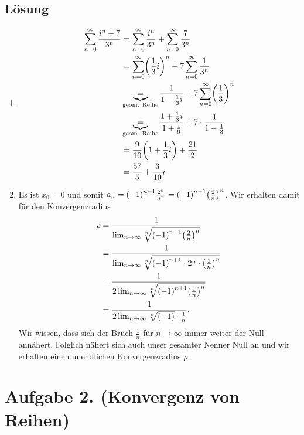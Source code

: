 \documentclass[german,12pt]{homework}
\DeclarePairedDelimiter{\enbrace}{(}{)}
\begin{document}
    \subsection*{Lösung}
    \begin{enumerate}
        \item
        \begin{align*}
            \sum_{n = 0}^\infty\frac{i^n + 7}{3^n} &= \sum_{n = 0}^\infty
            \frac{i^n}{3^n} + \sum_{n = 0}^\infty\frac{7}{3^n}\\
            &= \sum_{n = 0}^\infty\enbrace*{\frac{1}{3}i}^n + 7\sum_{n =
            0}^\infty\frac{1}{3^n}\\
            &\underbrace{=}_\text{geom. Reihe} \frac{1}{1 - \frac{1}{3}i} +
            7\sum_{n = 0}^\infty\enbrace*{\frac{1}{3}}^n\\
            &\underbrace{=}_\text{geom. Reihe} \frac{1 + \frac{1}{3}i}{1 +
            \frac{1}{9}} + 7 \cdot \frac{1}{1 - \frac{1}{3}}\\
            &= \frac{9}{10}\enbrace*{1 + \frac{1}{3}i} + \frac{21}{2}\\
            &= \frac{57}{5} + \frac{3}{10}i
        \end{align*}
        \item Es ist \(x_0 = 0\) und somit \(a_n = \enbrace*{-1}^{n - 1}\frac{2^n}{n^n} = \enbrace*{-1}^{n - 1}\enbrace*{\frac{2}{n}}^n\). Wir
        erhalten damit für den Konvergenzradius
        \begin{align*}
            \rho &= \frac{1}{\lim_{n \to \infty}\sqrt[n]{\enbrace*{-1}^{n - 1}
            \enbrace*{\frac{2}{n}}^n}}\\
            &= \frac{1}{\lim_{n \to \infty}\sqrt[n]{\enbrace*{-1}^{n + 1} \cdot
            2^n \cdot \enbrace*{\frac{1}{n}}^n}}\\
            &= \frac{1}{2\lim_{n \to \infty}\sqrt[n]{\enbrace*{-1}^{n + 1}
            \enbrace*{\frac{1}{n}}^n}}\\
            &= \frac{1}{2\lim_{n \to \infty}\sqrt[n]{\enbrace*{-1}} \cdot \frac{1}{n}}.
        \end{align*}
        Wir wissen, dass sich der Bruch \(\frac{1}{n}\) für \(n \to \infty\)
        immer weiter der Null annähert. Folglich nähert sich auch unser gesamter
        Nenner Null an und wir erhalten einen unendlichen Konvergenzradius
        \(\rho\).
    \end{enumerate}

    \section*{Aufgabe 2. (Konvergenz von Reihen)}
\end{document}

